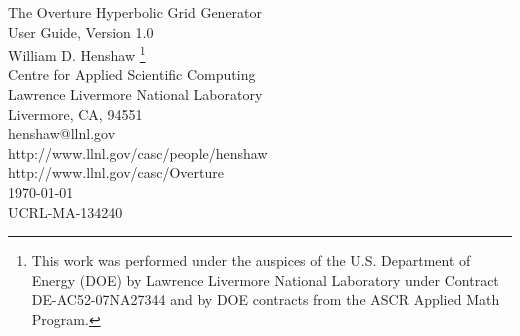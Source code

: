 \documentclass[11pt]{article}
\newcommand{\figures}{\homeHenshaw/OvertureFigures}
\begin{document}
\vspace{3\baselineskip}
\begin{flushleft}
  {\Large 
   The Overture Hyperbolic Grid Generator \\
   User Guide, Version 1.0 \\
  }
\vspace{ 2\baselineskip}
William D. Henshaw  
\footnote{
This work was performed under the auspices of the U.S. Department of Energy (DOE) by
  Lawrence Livermore National Laboratory under Contract DE-AC52-07NA27344 and by 
  DOE contracts from the ASCR Applied Math Program.
        }   \\
Centre for Applied Scientific Computing \\
Lawrence Livermore National Laboratory    \\
Livermore, CA, 94551   \\
henshaw@llnl.gov \\
http://www.llnl.gov/casc/people/henshaw \\
http://www.llnl.gov/casc/Overture \\
\vspace{1\baselineskip}
\today \\
\vspace{\baselineskip}
UCRL-MA-134240

\end{flushleft}

\vspace{1\baselineskip}

\begin{abstract}
This document describes the {\ff HyperbolicMapping} class for generating surface
and volume grids using a marching algorithm. Surface grids can be grown over
any other Mapping that defines a surface in three-dimensions including a
{\tt CompositeSurface} which represents a surface as a collection of multiple
sub-surfaces. Volume grids can be generated in two or three space dimensions.
A variety of boundary conditions are available.
\end{abstract}


\tableofcontents



\clearpage


\vfill\eject



\printindex
\end{document}
